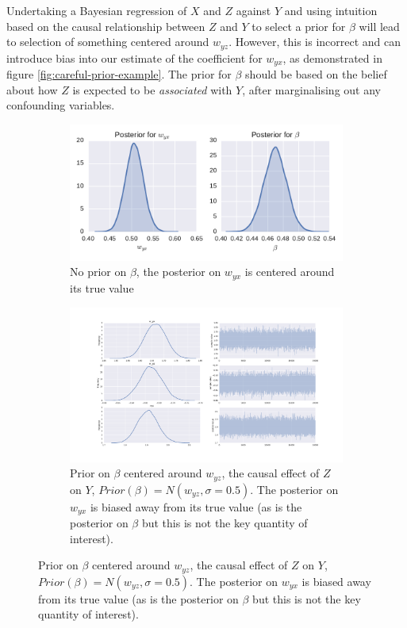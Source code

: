 \documentclass[11pt,a4paper,twoside]{report}
\theoremstyle{plain}
\theoremstyle{definition}
\begin{document}
Undertaking a Bayesian regression of $X$ and $Z$ against $Y$ and using intuition based on the causal relationship between $Z$ and $Y$ to select a prior for $\beta$ will lead to selection of something centered around $w_{yz}$. However, this is incorrect and can introduce bias into our estimate of the coefficient for $w_{yx}$, as demonstrated in figure \ref{fig:careful-prior-example}. The prior for $\beta$ should be based on the belief about how $Z$ is expected to be \emph{associated} with $Y$, after marginalising out any confounding variables. 

\begin{figure}[ht]
\begin{subfigure}[t]{0.99\textwidth}
     \caption{No prior on $\beta$, the posterior on $w_{yx}$ is centered around its true value}
    \includegraphics[scale=1]{prior_no_prior}
\end{subfigure}
\begin{subfigure}[t]{0.99\textwidth}
     \caption{Prior on $\beta$ centered around $w_{yz}$, the causal effect of $Z$ on $Y$, $Prior(\beta)= N(w_{yz},\sigma = 0.5)$. The posterior on $w_{yx}$ is biased away from its true value (as is the posterior on $\beta$ but this is not the key quantity of interest).}
    \includegraphics[scale=1]{prior_bad_prior.pdf}

\end{subfigure}
\end{figure}
\end{document}
